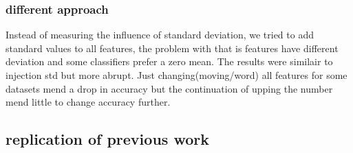 \documentclass[a4paper,10pt]{article}
\begin{document}
\subsubsection{different approach}
Instead of measuring the influence of standard deviation, we tried to add standard values to all features, the problem with that is features have different deviation and some classifiers prefer a zero mean. The results were similair to injection std but more abrupt. Just changing(moving/word) all features for some datasets mend a drop in accuracy but the continuation of upping the number mend little to change accuracy further.




\subsection{replication of previous work}
\end{document}
